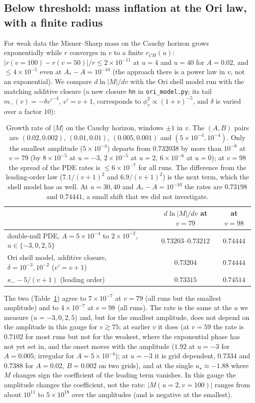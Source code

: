 \documentclass[11pt]{article}
\begin{document}
\subsection{Below threshold: mass inflation at the Ori law, with a finite radius}
\label{sec:below}

For weak data the Misner--Sharp mass on the Cauchy horizon grows exponentially while $r$ converges in $v$ to a finite $r_{CH}(u)$: $|r(v{=}100)-r(v{=}50)|/r\le2\times10^{-11}$ at $u=4$ and $u=40$ for $A=0.02$, and $\le4\times10^{-5}$ even at $A_*-A=10^{-10}$ (the approach there is a power law in $v$, not an exponential). We compare $d\ln|M|/dv$ with the Ori shell model run with the matching additive closure (a new closure \texttt{hn} in \texttt{ori\_model.py}; its tail $m_-(v)=-\delta v'^{-4}$, $v'=v+1$, corresponds to $\phi_v^2\propto(1+v)^{-5}$, and $\delta$ is varied over a factor $10$):
\begin{table}[h]
\centering\small
\begin{tabular}{p{}cc}
\toprule
& $d\ln|M|/dv$ at $v=79$ & at $v=98$\\
\midrule
double-null PDE, $A=5\times10^{-4}$ to $2\times10^{-2}$, $u\in\{-3,0,2,5\}$ & $0.73203$--$0.73212$ & $0.74444$\\
Ori shell model, additive closure, $\delta=10^{-3},10^{-2}$ ($v'=v+1$) & $0.73204$ & $0.74444$\\
$\kappa_--5/(v+1)$ (leading order) & $0.73315$ & $0.74514$\\
\bottomrule
\end{tabular}
\caption{Growth rate of $|M|$ on the Cauchy horizon, windows $\pm1$ in $v$. The $(A,B)$ pairs are $(0.02,0.002)$, $(0.01,0.01)$, $(0.005,0.001)$ and $(5\times10^{-4},10^{-4})$. Only the smallest amplitude ($5\times10^{-4}$) departs from $0.732038$ by more than $10^{-6}$ at $v=79$ (by $8\times10^{-5}$ at $u=-3$, $2\times10^{-5}$ at $u=2$, $6\times10^{-6}$ at $u=0$); at $v=98$ the spread of the PDE rates is $\le6\times10^{-7}$ for all runs. The difference from the leading-order law ($7.1/(v+1)^2$ and $6.9/(v+1)^2$) is the next term, which the shell model has as well. At $u=30,40$ and $A_*-A=10^{-10}$ the rates are $0.73198$ and $0.74441$, a small shift that we did not investigate.}
\label{tab:nlrate}
\end{table}
The two (Table~\ref{tab:nlrate}) agree to $7\times10^{-7}$ at $v=79$ (all runs but the smallest amplitude) and to $4\times10^{-7}$ at $v=98$ (all runs). The rate is the same at the $u$ we measure ($u=-3,0,2,5$) and, but for the smallest amplitude, does not depend on the amplitude in this gauge for $v\gtrsim75$; at earlier $v$ it does (at $v=59$ the rate is $0.7102$ for most runs but not for the weakest, where the exponential phase has not yet set in, and the onset moves with the amplitude ($1.92$ at $u=-3$ for $A=0.005$; irregular for $A=5\times10^{-4}$); at $u=-3$ it is grid dependent, $0.7334$ and $0.7388$ for $A=0.02$, $B=0.002$ on two grids), and at the single $u_\star\approx-1.88$ where $M$ changes sign the coefficient of the leading term vanishes. In this gauge the amplitude changes the coefficient, not the rate: $|M(u{=}2,v{=}100)|$ ranges from about $10^{11}$ to $5\times10^{18}$ over the amplitudes (and is negative at the smallest).
\end{document}
